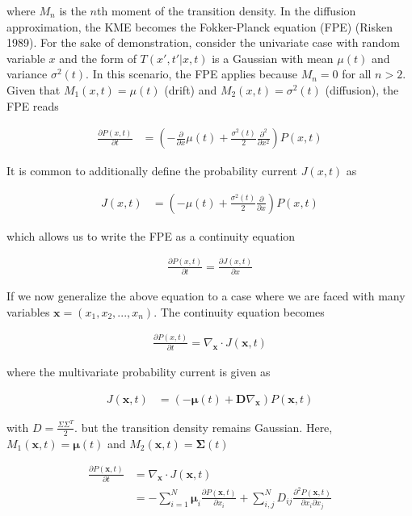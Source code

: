 \documentclass{article}
\begin{document}
where $M_{n}$ is the $n$th moment of the transition density. In the diffusion approximation, the KME becomes the Fokker-Planck equation (FPE) (Risken 1989). For the sake of demonstration, consider the univariate case with random variable $x$ and the form of $T(x',t'|x,t)$ is a Gaussian with mean $\mu(t)$ and variance $\sigma^{2}(t)$. In this scenario, the FPE applies because $M_{n} = 0$ for all $n > 2$. Given that $M_{1}(x,t) = \mu(t)$ (drift) and $M_{2}(x,t) = \sigma^{2}(t)$ (diffusion), the FPE reads

\begin{align}
\frac{\partial P(x,t)}{\partial t}  &= \left(-\frac{\partial}{\partial x}\mu(t) + \frac{\sigma^{2}(t)}{2}\frac{\partial^{2}}{\partial x^{2}}\right)P(x,t)
\end{align}

It is common to additionally define the probability current $J(x,t)$ as 

\begin{align}
J(x,t)  &= \left(-\mu(t) + \frac{\sigma^{2}(t)}{2}\frac{\partial}{\partial x}\right)P(x,t)
\end{align}

which allows us to write the FPE as a continuity equation

\begin{align}
\frac{\partial P(x,t)}{\partial t} = \frac{\partial J(x,t)}{\partial x}
\end{align}


If we now generalize the above equation to a case where we are faced with many variables $\bm{x} = (x_{1},x_{2},...,x_{n})$. The continuity equation becomes 

\begin{align}
\frac{\partial P(x,t)}{\partial t} = \nabla_{\bm{x}} \cdot J(\bm{x},t)
\end{align}

where the multivariate probability current is given as 

\begin{align}
J(\bm{x},t)  &= \left(-\bm{\mu}(t) + \bm{D}\nabla_{\bm{x}}\right)P(\bm{x},t)
\end{align}

with $D = \frac{\Sigma\Sigma^{T}}{2}$. but the transition density remains Gaussian. Here, $M_{1}(\bm{x},t) = \bm{\mu}(t)$ and $M_{2}(\bm{x},t) = \bm{\Sigma}(t)$

\begin{align}
\frac{\partial P(\bm{x},t)}{\partial t}  &= \nabla_{\bm{x}} \cdot J(\bm{x},t)\\
&= -\sum_{i=1}^{N}\bm{\mu}_{i}\frac{\partial P(\bm{x},t)}{\partial x_{i}} + \sum_{i,j}^{N} D_{ij}\frac{\partial^{2}P(\bm{x},t)}{\partial x_{i}\partial x_{j}} 
\end{align}
\end{document}
